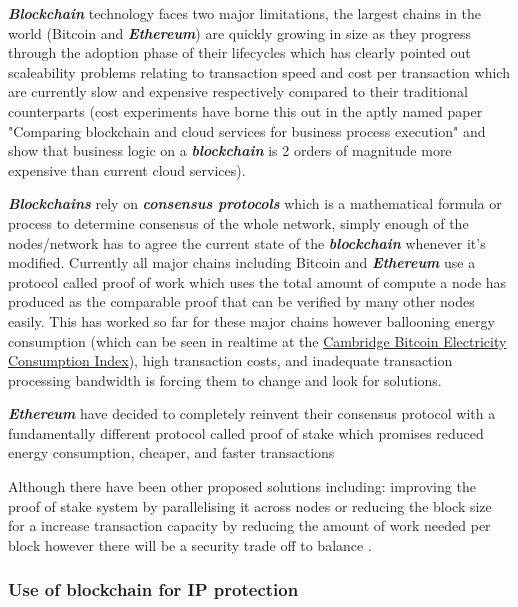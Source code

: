 \documentclass[12pt]{article}
\newcommand{\keyword}[1]{\textbf{\textit{#1}}}
\begin{document}


\keyword{Blockchain} technology faces two major limitations, the largest chains in the world (Bitcoin and \keyword{Ethereum}) are quickly growing in size as they progress through the adoption phase of their lifecycles which has clearly pointed out scaleability problems relating to transaction speed and cost per transaction which are currently slow and expensive respectively compared to their traditional counterparts (cost experiments have borne this out in the aptly named paper "Comparing blockchain and cloud services for business process execution"\cite{rimba2017comparing} and show that business logic on a \keyword{blockchain} is 2 orders of magnitude more expensive than current cloud services).


\keyword{Blockchains} rely on \keyword{consensus protocols} which is a mathematical formula or process to determine consensus of the whole network, simply enough of the nodes/network has to agree the current state of the \keyword{blockchain} whenever it's modified. Currently all major chains including Bitcoin and \keyword{Ethereum} use a protocol called proof of work \cite{PoW} which uses the total amount of compute a node has produced as the comparable proof that can be verified by many other nodes easily. This has worked so far for these major chains however ballooning energy consumption (which can be seen in realtime at the \href{https://ccaf.io/cbeci/index}{Cambridge Bitcoin Electricity Consumption Index}), high transaction costs, and inadequate transaction processing bandwidth is forcing them to change and look for solutions.

\keyword{Ethereum} have decided to completely reinvent their consensus protocol with a fundamentally different protocol called proof of stake which promises reduced energy consumption, cheaper, and faster transactions \cite{PoS}

Although there have been other proposed solutions including: improving the proof of stake system by parallelising it across nodes \cite{fi12080125} or reducing the block size for a increase transaction capacity by reducing the amount of work needed per block however there will be a security trade off to balance \cite{kiayias2015speed}.

\subsubsection{Use of blockchain for IP protection}
\end{document}
